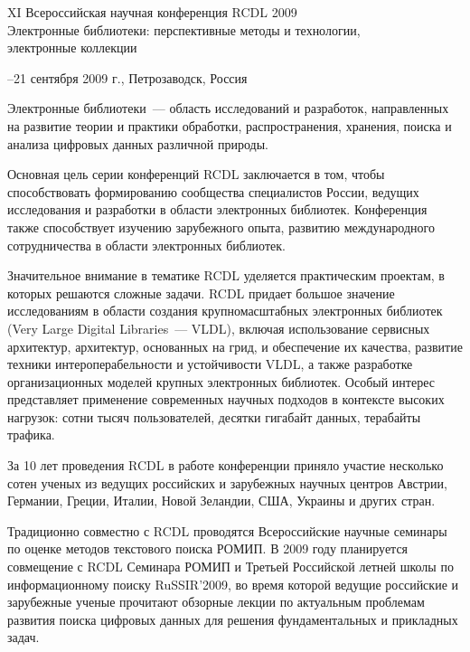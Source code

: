 \documentclass[10pt]{book}
\begin{document}
{\begin{center}\prg
{\Large
XI Всероссийская научная конференция RCDL 2009\\
Электронные библиотеки: перспективные методы и технологии,\\ электронные
коллекции}
\end{center}}

{\begin{center}--21 сентября 2009 г.,
Петрозаводск, Россия
\end{center}}

\vspace*{12pt}

Электронные библиотеки~--- область исследований и разработок, направленных 
на развитие теории и практики обработки, распространения, хранения, поиска 
и анализа цифровых данных различной природы. 

Основная цель серии конференций RCDL заключается в том, чтобы способствовать 
формированию сообщества специалистов России, ведущих исследования и разработки 
в области электронных библиотек. Конференция также способствует изучению 
зарубежного опыта, развитию международного сотрудничества в области электронных 
библиотек. 

Значительное внимание в тематике RCDL уделяется практическим проектам, в 
которых решаются сложные задачи. RCDL придает большое значение исследованиям 
в области создания крупномасштабных электронных библиотек (Very Large Digital 
Libraries~--- VLDL), включая использование сервисных архитектур, архитектур, 
основанных на грид, и обеспечение их качества, развитие техники 
интероперабельности и устойчивости VLDL, а также разработке организационных 
моделей крупных электронных библиотек. Особый интерес представляет применение 
современных научных подходов в контексте высоких нагрузок: сотни тысяч 
пользователей, десятки гигабайт данных, терабайты трафика.


За 10 лет проведения RCDL в работе конференции приняло участие несколько
сотен ученых из ведущих российских и зарубежных научных центров Австрии,
Германии, Греции, Италии, Новой Зеландии, США, Украины и других стран.

Традиционно совместно с RCDL проводятся Всероссийские научные семинары по оценке
методов текстового поиска РОМИП. В 2009 году планируется совмещение с RCDL
Семинара РОМИП и\linebreak
 Третьей Российской летней школы по информационному поиску RuSSIR'2009,
во время которой ведущие российские и зарубежные ученые прочитают
обзорные лекции по актуальным проблемам развития поиска цифровых данных для
решения фундаментальных и прикладных задач.
\vspace*{6pt}
\end{document}
